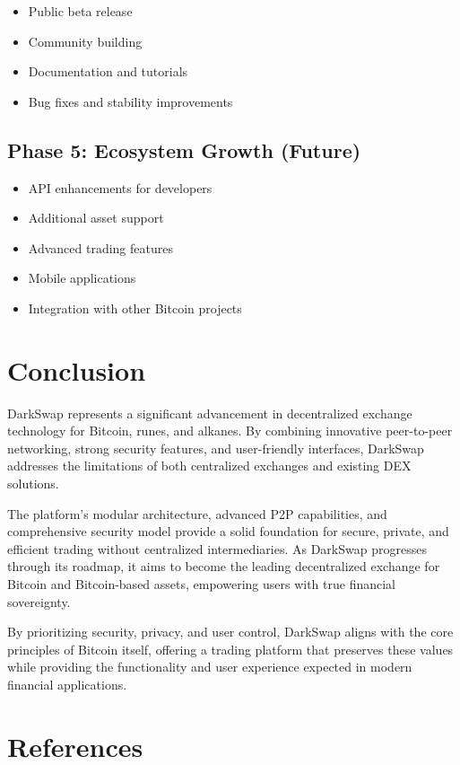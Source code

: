 \documentclass[11pt,a4paper]{article}
\begin{document}
\begin{itemize}
    \item Public beta release
    \item Community building
    \item Documentation and tutorials
    \item Bug fixes and stability improvements
\end{itemize}

\subsection{Phase 5: Ecosystem Growth (Future)}

\begin{itemize}
    \item API enhancements for developers
    \item Additional asset support
    \item Advanced trading features
    \item Mobile applications
    \item Integration with other Bitcoin projects
\end{itemize}

\section{Conclusion}

DarkSwap represents a significant advancement in decentralized exchange technology for Bitcoin, runes, and alkanes. By combining innovative peer-to-peer networking, strong security features, and user-friendly interfaces, DarkSwap addresses the limitations of both centralized exchanges and existing DEX solutions.

The platform's modular architecture, advanced P2P capabilities, and comprehensive security model provide a solid foundation for secure, private, and efficient trading without centralized intermediaries. As DarkSwap progresses through its roadmap, it aims to become the leading decentralized exchange for Bitcoin and Bitcoin-based assets, empowering users with true financial sovereignty.

By prioritizing security, privacy, and user control, DarkSwap aligns with the core principles of Bitcoin itself, offering a trading platform that preserves these values while providing the functionality and user experience expected in modern financial applications.

\section{References}
\end{document}
